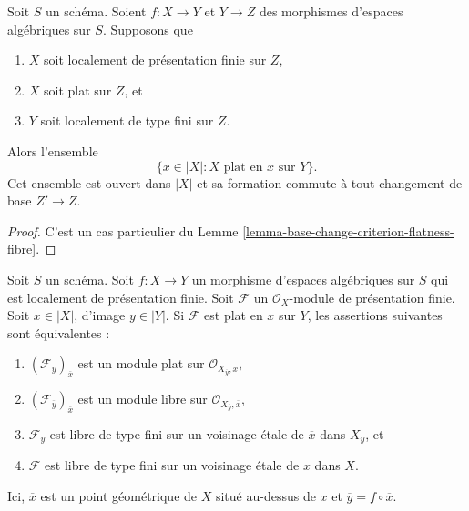 \begin{lemma}
\label{lemma-base-change-flatness-fibres}
Soit $S$ un schéma.
Soient $f : X \to Y$ et $Y \to Z$ des morphismes d'espaces algébriques sur $S$.
Supposons que
\begin{enumerate}
\item $X$ soit localement de présentation finie sur $Z$,
\item $X$ soit plat sur $Z$, et
\item $Y$ soit localement de type fini sur $Z$.
\end{enumerate}
Alors l'ensemble
$$
\{x \in |X| : X\text{ plat en }x \text{ sur }Y\}.
$$
Cet ensemble est ouvert dans $|X|$ et sa formation commute à tout changement de base
$Z' \to Z$.
\end{lemma}

\begin{proof}
C'est un cas particulier du
Lemme \ref{lemma-base-change-criterion-flatness-fibre}.
\end{proof}

\begin{lemma}
\label{lemma-flat-and-free-at-point-fibre}
Soit $S$ un schéma. Soit $f : X \to Y$ un morphisme d'espaces algébriques
sur $S$ qui est localement de présentation finie.
Soit $\mathcal{F}$ un $\mathcal{O}_X$-module de présentation finie.
Soit $x \in |X|$, d'image $y \in |Y|$. Si $\mathcal{F}$ est plat en $x$
sur $Y$, les assertions suivantes sont équivalentes :
\begin{enumerate}
\item $(\mathcal{F}_{\overline{y}})_{\overline{x}}$ est un module plat sur
$\mathcal{O}_{X_{\overline{y}}, \overline{x}}$,
\item $(\mathcal{F}_{\overline{y}})_{\overline{x}}$ est un module libre sur
$\mathcal{O}_{X_{\overline{y}}, \overline{x}}$,
\item $\mathcal{F}_{\overline{y}}$ est libre de type fini sur un
voisinage étale de $\overline{x}$ dans $X_{\overline{y}}$, et
\item $\mathcal{F}$ est libre de type fini sur un voisinage étale de $x$ dans $X$.
\end{enumerate}
Ici, $\overline{x}$ est un point géométrique de $X$ situé au-dessus de $x$
et $\overline{y} = f \circ \overline{x}$.
\end{lemma}

